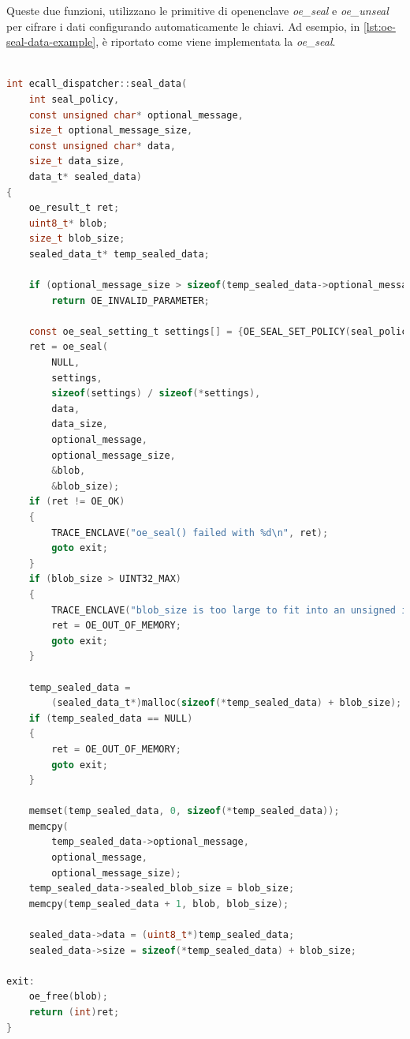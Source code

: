 \documentclass{article}
\begin{document}

Queste due funzioni, utilizzano le primitive di openenclave \textit{oe\_seal} e \textit{oe\_unseal} per cifrare i dati configurando automaticamente le chiavi. Ad esempio, in \cref{lst:oe-seal-data-example}, è riportato come viene implementata la \textit{oe\_seal}.

\begin{lstlisting}[language=c,caption=Utilizzo di oe\_seal,label=lst:oe-seal-data-example]
 
int ecall_dispatcher::seal_data(
    int seal_policy,
    const unsigned char* optional_message,
    size_t optional_message_size,
    const unsigned char* data,
    size_t data_size,
    data_t* sealed_data)
{
    oe_result_t ret;
    uint8_t* blob;
    size_t blob_size;
    sealed_data_t* temp_sealed_data;

    if (optional_message_size > sizeof(temp_sealed_data->optional_message))
        return OE_INVALID_PARAMETER;

    const oe_seal_setting_t settings[] = {OE_SEAL_SET_POLICY(seal_policy)};
    ret = oe_seal(
        NULL,
        settings,
        sizeof(settings) / sizeof(*settings),
        data,
        data_size,
        optional_message,
        optional_message_size,
        &blob,
        &blob_size);
    if (ret != OE_OK)
    {
        TRACE_ENCLAVE("oe_seal() failed with %d\n", ret);
        goto exit;
    }
    if (blob_size > UINT32_MAX)
    {
        TRACE_ENCLAVE("blob_size is too large to fit into an unsigned int");
        ret = OE_OUT_OF_MEMORY;
        goto exit;
    }

    temp_sealed_data =
        (sealed_data_t*)malloc(sizeof(*temp_sealed_data) + blob_size);
    if (temp_sealed_data == NULL)
    {
        ret = OE_OUT_OF_MEMORY;
        goto exit;
    }

    memset(temp_sealed_data, 0, sizeof(*temp_sealed_data));
    memcpy(
        temp_sealed_data->optional_message,
        optional_message,
        optional_message_size);
    temp_sealed_data->sealed_blob_size = blob_size;
    memcpy(temp_sealed_data + 1, blob, blob_size);

    sealed_data->data = (uint8_t*)temp_sealed_data;
    sealed_data->size = sizeof(*temp_sealed_data) + blob_size;

exit:
    oe_free(blob);
    return (int)ret;
}
\end{lstlisting}
\end{document}
